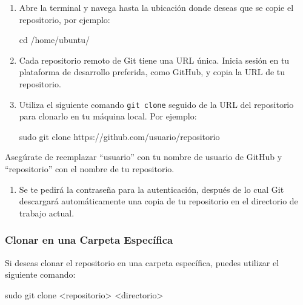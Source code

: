 \documentclass[
  a4paper,
]{article}
\newenvironment{Shaded}{}{}
\newcommand{\BuiltInTok}[1]{\textcolor[rgb]{0.84,0.23,0.29}{#1}}
\newcommand{\FunctionTok}[1]{\textcolor[rgb]{0.44,0.26,0.76}{#1}}
\newcommand{\NormalTok}[1]{\textcolor[rgb]{0.14,0.16,0.18}{#1}}
\newcommand{\OperatorTok}[1]{\textcolor[rgb]{0.14,0.16,0.18}{#1}}
\providecommand{\tightlist}{%
  \setlength{\itemsep}{0pt}\setlength{\parskip}{0pt}}\usepackage{longtable,booktabs,array}
\begin{document}
\begin{enumerate}
\def\labelenumi{\arabic{enumi}.}
\item
  Abre la terminal y navega hasta la ubicación donde deseas que se copie
  el repositorio, por ejemplo:

\begin{Shaded}
\begin{Highlighting}[]
\BuiltInTok{cd}\NormalTok{ /home/ubuntu/}
\end{Highlighting}
\end{Shaded}
\item
  Cada repositorio remoto de Git tiene una URL única. Inicia sesión en
  tu plataforma de desarrollo preferida, como GitHub, y copia la URL de
  tu repositorio.
\item
  Utiliza el siguiente comando \texttt{git\ clone} seguido de la URL del
  repositorio para clonarlo en tu máquina local. Por ejemplo:

\begin{Shaded}
\begin{Highlighting}[]
\FunctionTok{sudo}\NormalTok{ git clone https://github.com/usuario/repositorio}
\end{Highlighting}
\end{Shaded}
\end{enumerate}

Asegúrate de reemplazar ``usuario'' con tu nombre de usuario de GitHub y
``repositorio'' con el nombre de tu repositorio.

\begin{enumerate}
\def\labelenumi{\arabic{enumi}.}
\setcounter{enumi}{3}
\tightlist
\item
  Se te pedirá la contraseña para la autenticación, después de lo cual
  Git descargará automáticamente una copia de tu repositorio en el
  directorio de trabajo actual.
\end{enumerate}

\subsubsection{Clonar en una Carpeta
Específica}\label{clonar-en-una-carpeta-especuxedfica}

Si deseas clonar el repositorio en una carpeta específica, puedes
utilizar el siguiente comando:

\begin{Shaded}
\begin{Highlighting}[]
\FunctionTok{sudo}\NormalTok{ git clone }\OperatorTok{\textless{}}\NormalTok{repositorio}\OperatorTok{\textgreater{}} \OperatorTok{\textless{}}\NormalTok{directorio}\OperatorTok{\textgreater{}}
\end{Highlighting}
\end{Shaded}
\end{document}
